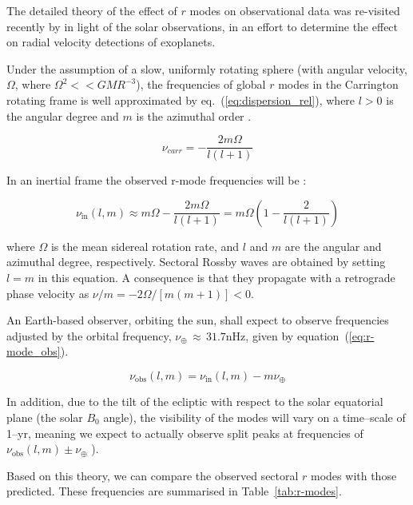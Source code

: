 The detailed theory of the effect of $r$ modes on observational data was re-visited recently by \citet{lanza_sectoral_2019} in light of the solar observations, in an effort to determine the effect on radial velocity detections of exoplanets.

Under the assumption of a slow, uniformly rotating sphere (with angular velocity, $\Omega$, where $\Omega^2 << GMR^{-3}$), the frequencies of global $r$ modes in the Carrington rotating frame is well approximated by eq.~(\ref{eq:dispersion_rel}), where $l > 0$ is the angular degree and $m$ is the azimuthal order \citep{loptien_global-scale_2018, lanza_sectoral_2019}.

\begin{equation}
\nu_{carr} = - \frac{2m\Omega}{l(l + 1)}
\label{eq:dispersion_rel}
\end{equation}

In an inertial frame the observed r-mode frequencies will be \citep{lanza_sectoral_2019}:

\begin{equation}
\nu_{\mathrm{in}}(l,m) \approx m\Omega - \frac{2m\Omega}{l(l + 1)}  = m\Omega \left(1 - \frac{2}{l(l + 1)}\right)
\label{eq:r-mode}
\end{equation}

where $\Omega$ is the mean sidereal rotation rate, and $l$ and $m$ are the angular and azimuthal degree, respectively. Sectoral Rossby waves are obtained by setting $l=m$ in this equation. A consequence is that they propagate with a retrograde phase velocity as $\nu / m = -2 \Omega/[m(m + 1)] < 0$.

An Earth-based observer, orbiting the sun, shall expect to observe frequencies adjusted by the orbital frequency, $\nu_\oplus \, \approx \, 31.7$nHz, given by equation~(\ref{eq:r-mode_obs}).

\begin{equation}
\nu_{\mathrm{obs}}(l,m) = \nu_{\mathrm{in}}(l,m) - m\nu_{\oplus}
\label{eq:r-mode_obs}
\end{equation}

In addition, due to the tilt of the ecliptic with respect to the solar equatorial plane (the solar $B_0$ angle), the visibility of the modes will vary on a time--scale of 1--yr, meaning we expect to actually observe split peaks at frequencies of $\nu_{\mathrm{obs}}(l,m) \pm \nu_{\oplus}$ \citep{lanza_sectoral_2019}).

Based on this theory, we can compare the observed sectoral $r$ modes with those predicted. These frequencies are summarised in Table~\ref{tab:r-modes}.

